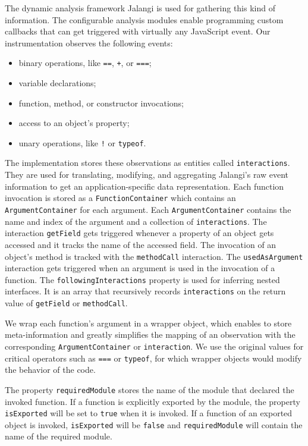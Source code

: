 \documentclass[english,cleveref,autoref,submission]{programming}
\begin{document}
The dynamic analysis framework Jalangi is used for gathering this kind of
information. The configurable analysis modules enable
programming custom callbacks that can get triggered with virtually any
JavaScript event. Our instrumentation observes the following events: 
\begin{itemize}
  \item binary operations, like \lstinline{==}, \lstinline{+}, or
    \lstinline{===};
  \item variable declarations;
  \item function, method, or constructor invocations;
  \item access to an object's property;
  \item unary operations, like \lstinline{!} or \lstinline{typeof}.
\end{itemize}

The implementation stores these observations as entities called
\texttt{interactions}. They are used for translating, modifying, and
aggregating Jalangi's raw event information to get an application-specific data representation. Each function invocation is stored as a \texttt{FunctionContainer} which contains an \texttt{ArgumentContainer} for each argument. Each \texttt{ArgumentContainer} contains the name and index of the argument and a collection of \texttt{interactions}. The interaction \texttt{getField} gets triggered whenever a property of an object gets accessed and it tracks the name of the accessed field. The invocation of an object's method is tracked with the \texttt{methodCall} interaction. The \texttt{usedAsArgument} interaction gets triggered when an argument is used in the invocation of a function. The \texttt{followingInteractions} property is used for inferring nested interfaces. It is an array that recursively records \texttt{interactions} on the return value of \texttt{getField} or \texttt{methodCall}.

We wrap each function's argument in a wrapper object, which enables to store meta-information and greatly simplifies the mapping of an observation with the corresponding \texttt{ArgumentContainer} or \texttt{interaction}. We use the original values for critical operators such as \texttt{===} or \texttt{typeof}, for which wrapper objects would modify the behavior of the code.

The property \texttt{requiredModule} stores the name of the module that declared the invoked function. If a function is explicitly exported by the module, the property \texttt{isExported} will be set to \texttt{true} when it is invoked. If a function of an exported object is invoked, \texttt{isExported} will be \texttt{false} and \texttt{requiredModule} will contain the name of the required module.
\end{document}
